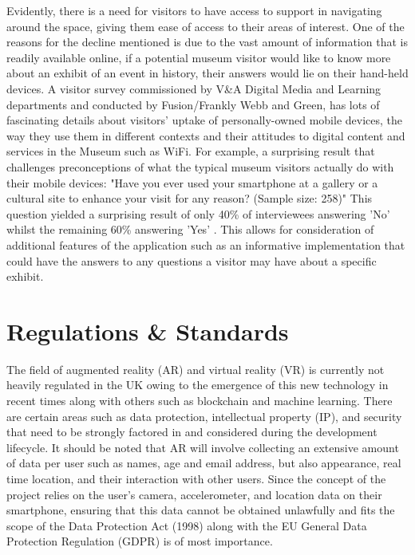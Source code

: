 Evidently, there is a need for visitors to have access to support in navigating around the space, giving them ease of access to their areas of interest. One of the reasons for the decline mentioned is due to the vast amount of information that is readily available online, if a potential museum visitor would like to know more about an exhibit of an event in history, their answers would lie on their hand-held devices. A visitor survey commissioned by V\&A Digital Media and Learning departments and
conducted by Fusion/Frankly Webb and Green, has lots of fascinating details about visitors' uptake of personally-owned mobile devices, the way they use them in different contexts and their attitudes to digital content and services in the Museum such as WiFi. For example, a surprising result that challenges preconceptions of what the typical museum visitors actually do with their mobile devices: "Have you ever used your smartphone at a gallery or a cultural site to enhance your visit for any
reason? (Sample size: 258)" This question yielded a surprising result of only 40\% of interviewees answering 'No' whilst the remaining 60\% answering 'Yes' \cite{Lewis}. This allows for consideration of additional features of the application such as an informative implementation that could have the answers to any questions a visitor may have about a specific exhibit.

\section{Regulations \& Standards}
The field of augmented reality (AR) and virtual reality (VR) is currently not heavily regulated in the UK owing to the emergence of this new technology in recent times along with others such as blockchain and machine learning. There are certain areas such as data protection, intellectual property (IP), and security that need to be strongly factored in and considered during the development lifecycle. It should be noted that AR will involve collecting an extensive amount of data per user such as names, age and email address, but also appearance, real time location, and their interaction with other users.  Since the concept of the project relies on the user's camera, accelerometer, and location data on their smartphone, ensuring that this data cannot be obtained unlawfully and fits the scope of the Data Protection Act (1998) along with the EU General Data Protection Regulation (GDPR) is of most importance.\cite{ITProPortal}\\

